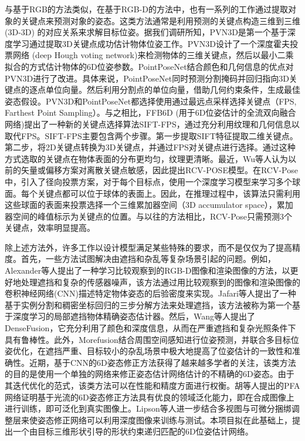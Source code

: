 \documentclass[12pt]{article}
\begin{document}
与基于RGB的方法类似，在基于RGB-D的方法中，也有一系列的工作通过提取对象的关键点来预测对象的姿态。这类方法通常是利用预测的关键点构造三维到三维 (3D-3D) 的对应关系来求解目标位姿。据我们调研所知，PVN3D\cite{he2020pvn3d54}是第一个基于深度学习通过提取3D关键点成功估计物体位姿工作。PVN3D设计了一个深度霍夫投票网络 (deep Hough voting network)来检测物体的三维关键点，然后以最小二乘拟合的方式估计物体的6D位姿参数。PointPoseNet\cite{chen2020pointposenet55}结合颜色和几何信息的优点对PVN3D进行了改进。具体来说，PointPoseNet同时预测分割掩码并回归指向3D关键点的逐点单位向量。然后利用分割点的单位向量，借助几何约束条件，生成最佳姿态假设。PVN3D和PointPoseNet都选择使用通过最远点采样选择关键点（FPS, Farthest Point Sampling）。与之相比，FFB6D (用于6D位姿估计的全流双向融合网络)\cite{he2021ffb6d56}提出了一种新的关键点选择算法SIFT-FPS，通过充分利用纹理和几何信息以取代FPS。SIFT-FPS主要包含两个步骤。第一步提取SIFT特征提取二维关键点。第二步，将2D关键点转换为3D关键点，并通过FPS对关键点进行选择。通过这种方式选取的关键点在物体表面的分布更均匀，纹理更清晰。最近，Wu等人\cite{wu2022vote57}认为以前的矢量或偏移方案对离散关键点敏感，因此提出RCV-POSE模型。在RCV-Pose中，引入了径向投票方案，对于每个目标点，使用一个深度学习模型来学习多个球面。每个关键点都可以位于球体的表面上。因此，在推理过程中，该算法只需利用这些球面的表面来投票选择一个三维累加器空间（3D accumulator space），累加器空间的峰值标示为关键点的位置。与以往的方法相比，RCV-Pose只需预测3个关键点，效率明显提高。

除上述方法外，许多工作以设计模型满足某些特殊的要求，而不是仅仅为了提高精度。首先，一些方法试图解决由遮挡和杂乱等复杂场景引起的问题。例如，Alexander等人\cite{krull2015learning58}提出了一种学习比较观察到的RGB-D图像和渲染图像的方法，以更好地处理遮挡和复杂的传感器噪声，该方法通过用比较观察到的图像和渲染图像的卷积神经网络(CNN)描述特定物体姿态的后验密度来实现。Jafari等人\cite{hosseini2019ipose59}提出了一种基于实例分割和稠密坐标回归的三步分解方法来处理遮挡，该方法被称为第一个基于深度学习的局部遮挡物体精确姿态估计器。然后，Wang等人\cite{wang2019densefusion60}提出了DenseFusion，它充分利用了颜色和深度信息，从而在严重遮挡和复杂光照条件下具有鲁棒性。此外，Morefusion\cite{wada2020morefusion61}结合周围空间感知进行位姿预测，并联合多目标位姿优化，在遮挡严重、目标较小的杂乱场景中极大地提高了位姿估计的一致性和准确性。近期，基于CNN的6D姿态修正方法获得了越来越多学者的关注，该类方法的目的是使用一个单独的网络来修正姿态估计网络估计的不精确的6D姿态。由于其迭代优化的范式，该类方法可以在性能和精度方面进行权衡。胡等人\cite{Hu2022}提出的PFA网络证明基于光流的6D姿态修正方法具有优良的领域泛化能力，即在合成图像上进行训练，即可泛化到真实图像上。Lipson等人\cite{Lipson2022}进一步结合多视图与可微分捆绑调整层来使姿态修正网络可以利用深度图像来训练与测试。本项目拟在此基础上，提出一个由目标三维形状引导的形状约束递归匹配的6D位姿估计网络。
\end{document}
